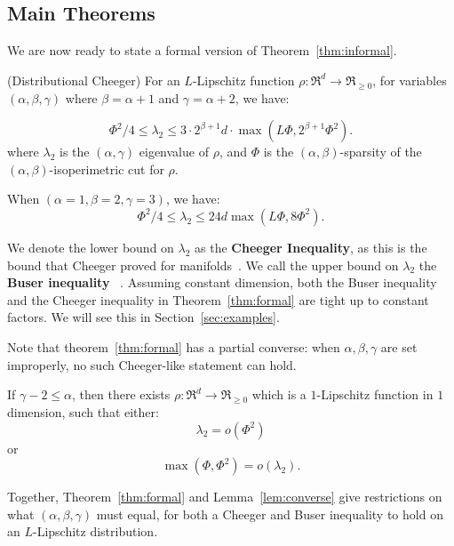 \subsection{Main Theorems}
We are now ready to state a formal version of
Theorem~\ref{thm:informal}.
\begin{theorem}\label{thm:formal} (Distributional Cheeger)
For an $L$-Lipschitz function $\rho: \Re^d
  \rightarrow \Re_{\geq 0}$, for variables $(\alpha, \beta, \gamma)$
  where $\beta = \alpha +1$ and $\gamma = \alpha+2$, we have:

\[ \Phi^2/4 \leq \lambda_2 \leq 3 \cdot 2^{\beta+1}d \cdot
\max(L\Phi ,2^{\beta + 1}\Phi^2). \]
  where $\lambda_2$ is the $(\alpha, \gamma)$ eigenvalue of $\rho$,
  and $\Phi$ is the $(\alpha, \beta)$-sparsity of the $(\alpha,
  \beta)$-isoperimetric
  cut for $\rho$.
\end{theorem}
When $(\alpha = 1, \beta = 2, \gamma = 3)$, we have:
\[ \Phi^2/4 \leq \lambda_2 \leq 24d 
\max(L\Phi, 8\Phi^2). \]

We denote the lower bound on $\lambda_2$ as the \textbf{Cheeger
Inequality}, as this is the bound that Cheeger
proved for manifolds~\cite{Cheeger70}. We call the upper bound on
$\lambda_2$ the \textbf{Buser inequality}
~\cite{Buser82}.
Assuming constant dimension, both the Buser inequality and the
Cheeger inequality in Theorem~\ref{thm:formal}
are tight up to constant factors. We will see this in
Section~\ref{sec:examples}.

Note that theorem~\ref{thm:formal} has a partial converse: when $\alpha, \beta,
\gamma$ are set improperly, no such Cheeger-like statement can
hold.
\begin{lemma}\label{lem:converse}
If $\gamma - 2 \leq \alpha$, then
  there exists $\rho: \Re^d \to \Re_{\geq 0}$ which is a $1$-Lipschitz function in
  $1$ dimension, such that either:
  \[
    \lambda_2 =  o(\Phi^2)
    \]
  or 
  \[ 
    \max(\Phi, \Phi^2) = o(\lambda_2).
  \]
\end{lemma}
Together, Theorem~\ref{thm:formal} and Lemma~\ref{lem:converse}
give restrictions on what $(\alpha, \beta, \gamma)$ must
equal, for both a Cheeger and Buser inequality to hold on an $L$-Lipschitz
distribution.
